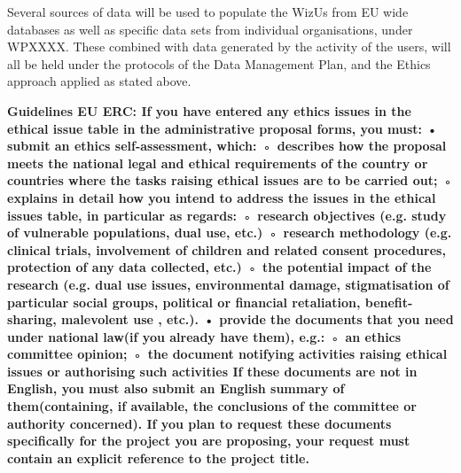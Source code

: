 \documentclass[11pt,a4paper]{report}
\newcommand{\project}{WizUs\xspace}
\newcommand{\eu}[1]{{\color{teal}\textbf{Guidelines EU ERC: #1}}}
\begin{document}
Several sources of data will be used to populate the \project from EU wide
databases as well as specific data sets from individual organisations, under
WPXXXX. These combined with data generated by the activity of the users, will
all be held under the protocols of the Data Management Plan, and the Ethics
approach applied as stated above.

\eu{
If you have entered any ethics issues in the ethical issue table in the administrative proposal forms, you must:
    • submit an ethics self-assessment, which:
        ◦ describes how the proposal meets the national legal and ethical requirements of the country or countries where the tasks raising ethical issues are to be carried out;
        ◦ explains in detail how you intend to address the issues in the ethical issues table, in particular as regards:
        ◦ research objectives (e.g. study of vulnerable populations, dual use, etc.)
        ◦ research methodology (e.g. clinical trials, involvement of children and related consent procedures, protection of any data collected, etc.)
        ◦ the potential impact of the research (e.g. dual use issues, environmental damage, stigmatisation  of  particular  social  groups,  political  or  financial  retaliation, benefit-sharing,  malevolent use , etc.).
    • provide the documents that you need under national law(if you already have them), e.g.:
        ◦ an ethics committee opinion;
        ◦ the document notifying activities raising ethical issues or authorising such activities
 If these documents are not in English, you must also submit an English summary of them(containing, if available, the conclusions of the committee or authority concerned).
 If you plan to request these documents specifically for the project you are
 proposing, your request must contain an explicit reference to the project
 title.
}
\end{document}
